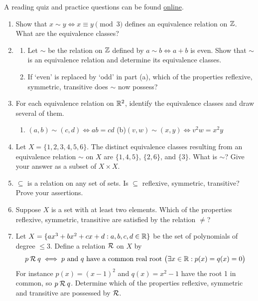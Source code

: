 \goodbreak


\begin{exercises}{}{}
	A reading quiz and practice questions can be found \href{http://www.math.uci.edu/~ndonalds/math13/selftest/7-3-equiv.html}{online}.

	\begin{enumerate}
	  \item\label{exs:cong3} Show that $x\sim y\Longleftrightarrow x\equiv y\pmod 3$ defines an equivalence relation on $\mathbb{Z}$. What are the equivalence classes?
	  
	  	
	  \item\begin{enumerate}
	  	\item Let $\sim$ be the relation on $\mathbb{Z}$ defined by $a\sim b\Longleftrightarrow a+b$ is even. Show that $\sim$ is an equivalence relation and determine its equivalence classes.
	  	\item If `even' is replaced by `odd' in part (a), which of the properties reflexive, symmetric, transitive does $\sim$ now possess?
	  \end{enumerate}
	  
		
		\item For each equivalence relation on $\mathbb{R}^2$, identify the equivalence classes and draw several of them.
		\begin{enumerate}
			\item $(a,b)\sim(c,d)\iff ab=cd$ \qquad\qquad\qquad (b)\lstsp $(v,w)\sim(x,y)\iff v^2w=x^2y$
		\end{enumerate}	
	
	
		\item Let $X=\{1,2,3,4,5,6\}$. The distinct equivalence classes resulting from an equivalence relation $\sim$ on $X$ are $\{1,4,5\}$, $\{2,6\}$, and $\{3\}$. What is $\sim$? Give your answer as a subset of $X\times X$.
	
	
		\item $\subseteq$ is a relation on any set of sets. Is $\subseteq$ reflexive, symmetric, transitive? Prove your assertions.
	  
		
	  \item Suppose $X$ is a set with at least two elements. Which of the properties reflexive, symmetric, transitive are satisfied by the relation $\neq$?
	
	
		\item Let $X=\{ax^3+bx^2+cx+d:a,b,c,d\in\mathbb{R}\}$ be the set of polynomials of degree $\le 3$. Define a relation $\mathcal{R}$ on $X$ by
	  \[
	  	p\mathbin{\mathcal{R}} q\iff p\text{ and $q$ have a common real root} \  \bigl(\exists x\in\mathbb{R}: p(x)=q(x)=0\bigr)
	  \]
	  For instance $p(x)=(x-1)^2$ and $q(x)=x^2-1$ have the root 1 in common, so $p\mathbin{\mathcal{R}} q$. Determine which of the properties reflexive, symmetric and transitive are possessed by $\mathcal{R}$.
	

\end{enumerate}
\end{exercises}
